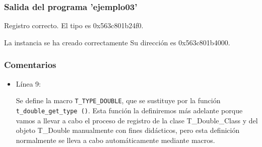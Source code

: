  \subsubsection{Salida del programa 'ejemplo03'}
\textsf{Registro correcto. El tipo es 0x563c801b24f0.}\par
\textsf{La instancia se ha creado correctamente Su dirección es 0x563c801b4000.}\par

\subsubsection{Comentarios}
\begin{itemize}
\item Línea 9:\par
  Se define la macro \texttt{T\_TYPE\_DOUBLE}, que se sustituye por la función
  \texttt{t\_double\_get\_type ()}. Esta función la definiremos más adelante porque vamos a llevar a cabo
  el proceso de registro de la clase \textsf{T\_Double\_Class} y del objeto \textsf{T\_Double} manualmente
  con fines didácticos,  pero esta definición normalmente se lleva a cabo automáticamente mediante macros.
  

\end{itemize}

